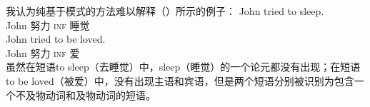\begin{exe}
\begin{xlist}[iv.]
\begin{exe}
\begin{xlist}[iv.]
我认为纯基于模式的方法难以解释（）所示的例子：
\eal
\ex 
\gll John tried to sleep.\\
     John 努力 \textsc{inf} 睡觉\\
\ex
\gll John tried to be loved.\\
     John 努力 \textsc{inf} \passive{} 爱\\
\zl
虽然在短语to sleep（去睡觉）中，sleep（睡觉）的一个论元都没有出现；在短语to be loved（被爱）中，没有出现主语和宾语，但是两个短语分别被识别为包含一个不及物动词和及物动词的短语。  


\end{xlist}
\end{exe}
\end{xlist}
\end{exe}
